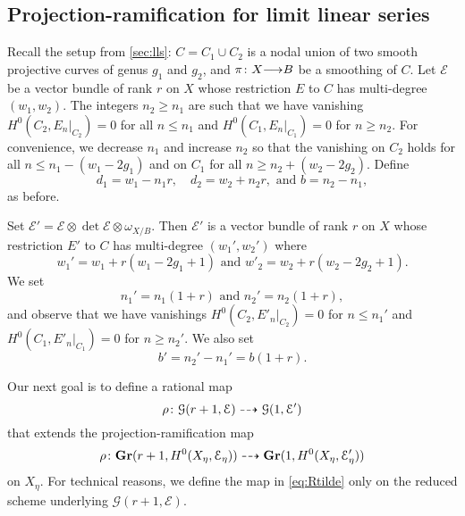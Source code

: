 \documentclass[11pt,reqno]{amsart}
\theoremstyle{plain}
\theoremstyle{definition}
\theoremstyle{remark}
\numberwithin{equation}{section}
\renewcommand{\to}{{\longrightarrow}}
\numberwithin{equation}{section}
\begin{document}
\subsection{Projection-ramification for limit linear series}
Recall the setup from \autoref{sec:lls}: $C = C_1 \cup C_2$ is a nodal union of two smooth projective curves of genus $g_1$ and $g_2$, and $\pi \from X \to B$ be a smoothing of $C$.
Let $\mathcal E$ be a vector bundle of rank $r$ on $X$ whose restriction $E$ to $C$ has multi-degree $(w_1, w_2)$.
The integers $n_2 \geq n_1$ are such that we have vanishing $H^0(C_2, E_n|_{C_2}) = 0$ for all $n \leq n_1$ and $H^0(C_1, E_n|_{C_1}) = 0$ for $n \geq n_2$.
For convenience, we decrease $n_1$ and increase $n_2$ so that the vanishing on $C_2$ holds for all $n \leq n_1 - (w_1-2g_1)$ and on $C_1$ for all $n \geq n_2 + (w_2-2g_2)$.
Define
\[ d_1 = w_1 - n_1r, \quad d_2 = w_2 + n_2r,\text{ and } b = n_2 - n_1,\]
as before.

Set $\mathcal E' = \mathcal E \otimes \det \mathcal E \otimes \omega_{X/B}$.
Then $\mathcal E'$ is a vector bundle of rank $r$ on $X$ whose restriction $E'$ to $C$ has multi-degree $(w_1', w_2')$ where
\[ w_1' = w_1 + r(w_1-2g_1+1) \text{ and } w'_2 = w_2 + r(w_2-2g_2+1).\]
We set
\[ n_1' = n_1(1+r) \text{ and } n_2' = n_2(1+r),\]
and observe that we have vanishings $H^0(C_2, E'_{n}|_{C_2}) = 0$ for $n \leq n_1'$ and $H^0(C_1, E'_{n}|_{C_1}) = 0$ for $n \geq n_2'$.
We also set
\[ b' = n_2' - n_1' = b(1+r).\]

Our next goal is to define a rational map
\begin{equation}\label{eq:Rtilde}
  \rho {\colon} {\mathcal G}(r+1, \mathcal E) \dashrightarrow {\mathcal G}(1, \mathcal E')
\end{equation}
that extends the projection-ramification map
\[
  \rho {\colon} {\bf Gr}(r+1, H^0(X_\eta, \mathcal E_\eta)) \dashrightarrow {\bf Gr}(1, H^0(X_\eta, \mathcal E'_\eta))
\]
on $X_\eta$.
For technical reasons, we define the map in \eqref{eq:Rtilde} only on the reduced scheme underlying ${\mathcal G}(r+1, \mathcal E)$.
\end{document}
